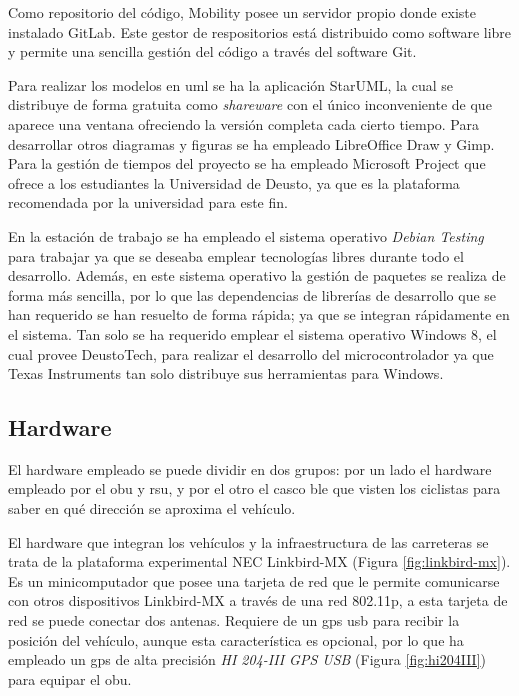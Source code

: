 Como repositorio del código, Mobility posee un servidor propio donde existe
instalado GitLab. Este gestor de respositorios está distribuido como software
libre y permite una sencilla gestión del código a través del software Git.

Para realizar los modelos en \gls{uml} se ha la aplicación StarUML, la cual
se distribuye de forma gratuita como \emph{shareware} con el único inconveniente
de que aparece una ventana ofreciendo la versión completa cada cierto tiempo.
Para desarrollar otros diagramas y figuras se ha empleado LibreOffice Draw y
Gimp. Para la gestión de tiempos del proyecto se ha empleado Microsoft Project
que ofrece a los estudiantes la Universidad de Deusto, ya que es la plataforma
recomendada por la universidad para este fin.

En la estación de trabajo se ha empleado el sistema operativo \emph{Debian
Testing} para trabajar ya que se deseaba emplear tecnologías libres durante
todo el desarrollo. Además, en este sistema operativo la gestión de paquetes
se realiza de forma más sencilla, por lo que las dependencias de librerías de
desarrollo que se han requerido se han resuelto de forma rápida; ya que se
integran rápidamente en el sistema. Tan solo se ha requerido emplear el sistema
operativo Windows 8, el cual provee DeustoTech, para realizar el desarrollo
del microcontrolador ya que Texas Instruments tan solo distribuye sus
herramientas para Windows.

\subsection{Hardware}
El hardware empleado se puede dividir en dos grupos: por un lado el hardware
empleado por el \gls{obu} y \gls{rsu}, y por el otro el casco \gls{ble} que
visten los ciclistas para saber en qué dirección se aproxima el vehículo.

El hardware que integran los vehículos y la infraestructura de las carreteras
se trata de la plataforma experimental NEC Linkbird-MX (Figura
\ref{fig:linkbird-mx}). Es un minicomputador que posee una tarjeta de red que
le permite comunicarse con otros dispositivos Linkbird-MX a través de una red
\Gls{802.11p}, a esta tarjeta de red se puede conectar dos antenas. Requiere
de un \gls{gps} \gls{usb} para recibir la posición del vehículo, aunque esta
característica es opcional, por lo que ha empleado un \gls{gps} de alta
precisión \emph{HI 204-III GPS USB} (Figura \ref{fig:hi204III}) para equipar
el \gls{obu}.

